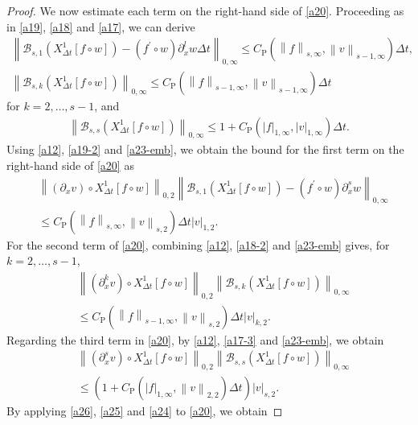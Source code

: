 \documentclass[10pt,a4paper,tbtags,leqno]{amsart}
\theoremstyle{definition}
\numberwithin{equation}{section}
\def\norm#1#2{\left\|#2\right\|_{#1}}
\def\snorm#1#2{\left|#2\right|_{#1}}
\begin{document}
\begin{proof}
  We now estimate each term on the right-hand side of \eqref{a20}. 
  Proceeding as in \eqref{a19}, \eqref{a18} and \eqref{a17}, we can derive 
  \begin{gather} 
    \norm{0, \infty}{\mathcal{B}_{s, 1} ({X_{\Delta t}^1} [f \circ w]) - (f^\prime \circ w) \partial_x^l w \Delta t} \leq C_{\mathrm{P}} (\norm{s,\infty}{f}, \norm{s-1,\infty}{v}) \Delta t, \label{a19-2} \\
    \norm{0, \infty}{\mathcal{B}_{s, k} ({X_{\Delta t}^1} [f \circ w])} \leq C_{\mathrm{P}} (\norm{s - 1,\infty}{f}, \norm{s - 1,\infty}{v}) \Delta t \label{a18-2} 
  \end{gather} 
  for $ k = 2, \ldots, s - 1 $, and 
  \begin{align}
    \norm{0, \infty}{\mathcal{B}_{s, s} ({X_{\Delta t}^1} [f \circ w])} \leq 1 + C_{\mathrm{P}} (\snorm{1,\infty}{f}, \snorm{1,\infty}{v}) \Delta t. \label{a17-3} 
  \end{align} 
  Using \eqref{a12}, \eqref{a19-2} and \eqref{a23-emb}, we obtain the bound for the first term on the right-hand side of \eqref{a20} as 
  \begin{align} 
    & \norm{0, 2}{(\partial_x v) \circ {X_{\Delta t}^1}[f \circ w]} \norm{0, \infty}{\mathcal{B}_{s, 1} ({X_{\Delta t}^1} [f \circ w]) - (f^\prime \circ w) \partial_x^s w} \\ & \leq C_{\mathrm{P}} (\norm{s,\infty}{f}, \norm{s, 2}{v}) \Delta t \snorm{1, 2}{v}. \label{a26} 
  \end{align} 
  For the second term of \eqref{a20}, combining \eqref{a12}, \eqref{a18-2} and \eqref{a23-emb} gives, for $ k = 2,\ldots, s - 1 $, 
  \begin{align} 
    & \norm{0, 2}{(\partial_x^k v) \circ {X_{\Delta t}^1}[f \circ w]} \norm{0, \infty}{\mathcal{B}_{s, k} ({X_{\Delta t}^1} [f \circ w])} \\ & \leq C_{\mathrm{P}} (\norm{s - 1,\infty}{f}, \norm{s, 2}{v}) \Delta t \snorm{k, 2}{v}. \label{a25} 
  \end{align} 
  Regarding the third term in \eqref{a20}, by \eqref{a12}, \eqref{a17-3} and \eqref{a23-emb}, we obtain 
  \begin{align} 
    & \norm{0, 2}{(\partial_x^s v) \circ {X_{\Delta t}^1}[f \circ w]} \norm{0, \infty}{\mathcal{B}_{s, s} ({X_{\Delta t}^1} [f \circ w])} \\ & \leq \left(1 + C_{\mathrm{P}} (\snorm{1,\infty}{f}, \norm{2, 2}{v}) \Delta t\right) \snorm{s, 2}{v}. \label{a24} 
  \end{align} 
  By applying \eqref{a26}, \eqref{a25} and \eqref{a24} to \eqref{a20}, we obtain 

\end{proof}
\end{document}
